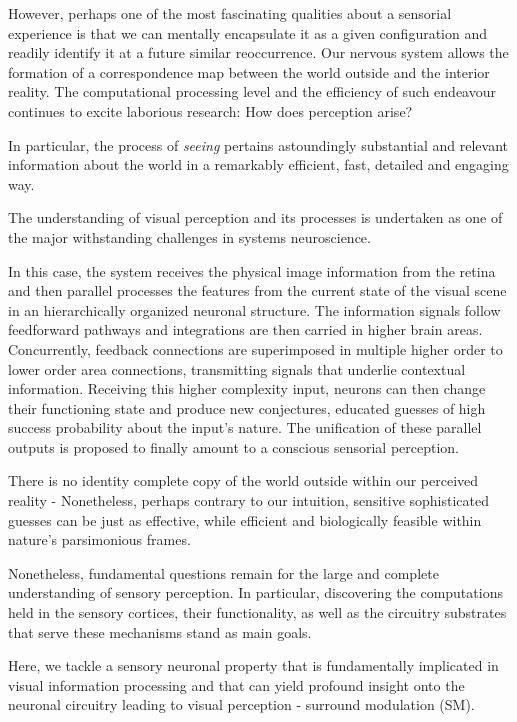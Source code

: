 However, perhaps one of the most fascinating qualities about a sensorial experience is that we can mentally encapsulate it as a given configuration and readily identify it at a future similar reoccurrence. Our nervous system allows the formation of a correspondence map between the world outside and the interior reality. The computational processing level and the efficiency of such endeavour continues to excite laborious research: How does perception arise?

In particular, the process of \textit{seeing} pertains astoundingly substantial and relevant information about the world in a remarkably efficient, fast, detailed and engaging way.

The understanding of visual perception and its processes is undertaken as one of the major withstanding challenges in systems neuroscience.

In this case, the system receives the physical image information from the retina and then parallel processes the features from the current state of the visual scene in an hierarchically organized neuronal structure. The information signals follow feedforward pathways and integrations are then carried in higher brain areas. Concurrently, feedback connections are superimposed in multiple higher order to lower order area connections, transmitting signals that underlie contextual information. Receiving this higher complexity input, neurons can then change their functioning state and produce new conjectures, educated guesses of high success probability about the input's nature. 
The unification of these parallel outputs is proposed to finally amount to a conscious sensorial perception.

There is no identity complete copy of the world outside within our perceived reality - Nonetheless, perhaps contrary to our intuition, sensitive sophisticated guesses can be just as effective, while efficient and biologically feasible within nature's parsimonious frames.

Nonetheless, fundamental questions remain for the large and complete understanding of sensory perception. In particular, discovering the computations held in the sensory cortices, their functionality, as well as the circuitry substrates that serve these mechanisms stand as main goals.

Here, we tackle a sensory neuronal property that is fundamentally implicated in visual information processing and that can yield profound insight onto the neuronal circuitry leading to visual perception - surround modulation (SM).

